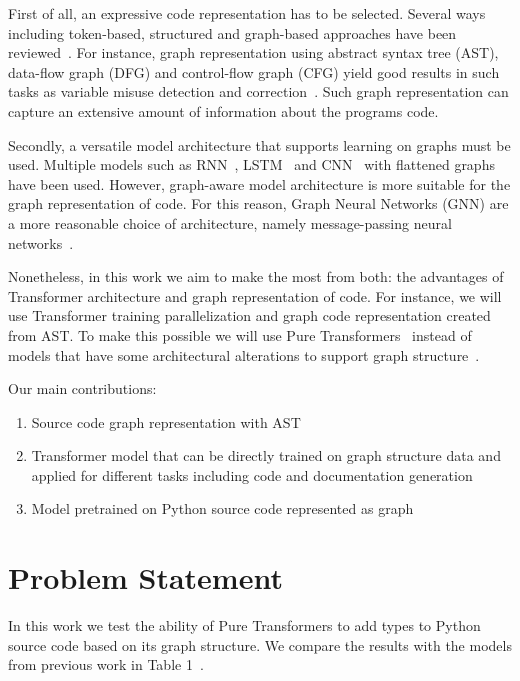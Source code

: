 \documentclass[conference]{IEEEtran}
\begin{document}
First of all, an expressive code representation has to be selected.
Several ways including token-based, structured and graph-based approaches have been reviewed~\cite{sm_avdoshin_code_2022}.
For instance, graph representation using abstract syntax tree (AST), data-flow graph (DFG) and control-flow graph (CFG)
yield good results in such tasks as variable misuse detection and correction~\cite{allamanis_learning_2017}.
Such graph representation can capture an extensive amount of information about the programs code.

Secondly, a versatile model architecture that supports learning on graphs must be used.
Multiple models such as RNN~\cite{white_deep_2016}, LSTM~\cite{wei_supervised_2017} and CNN~\cite{mou_convolutional_2016} with flattened graphs have been used.
However, graph-aware model architecture is more suitable for the graph representation of code.
For this reason, Graph Neural Networks (GNN) are a more reasonable choice of architecture,
namely message-passing neural networks~\cite{allamanis_learning_2017}.

Nonetheless, in this work we aim to make the most from both: the advantages of Transformer architecture and graph representation of code.
For instance, we will use Transformer training parallelization and graph code representation created from AST.
To make this possible we will use Pure Transformers~\cite{kim_pure_2022} instead of models that have some architectural alterations to support graph structure~\cite{kreuzer_rethinking_2021,dwivedi_generalization_2021,ying_transformers_2021}.

Our main contributions:
\begin{enumerate}
    \item Source code graph representation with AST
    \item Transformer model that can be directly trained on graph structure data and applied for different tasks including code and documentation generation
    \item Model pretrained on Python source code represented as graph
\end{enumerate}

\section{Problem Statement}\label{sec:problem-statement}

In this work we test the ability of Pure Transformers to add types to Python source code based on its graph structure.
We compare the results with the models from previous work in Table 1~\cite{allamanis2020typilus}.
\end{document}
